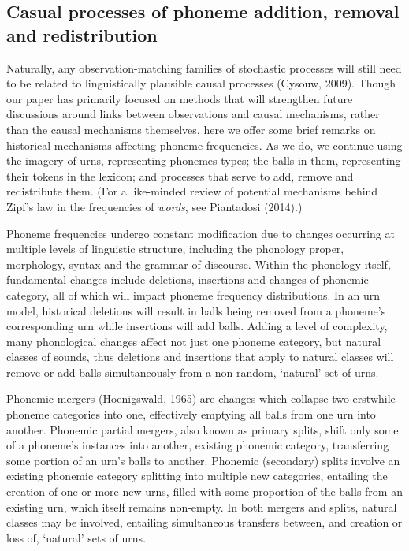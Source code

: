 \hypertarget{casual-processes-of-phoneme-addition-removal-and-redistribution}{%
\subsection*{Casual processes of phoneme addition, removal and redistribution}\label{casual-processes-of-phoneme-addition-removal-and-redistribution}}

Naturally, any observation-matching families of stochastic processes will still need to be related to linguistically plausible causal processes (Cysouw, 2009). Though our paper has primarily focused on methods that will strengthen future discussions around links between observations and causal mechanisms, rather than the causal mechanisms themselves, here we offer some brief remarks on historical mechanisms affecting phoneme frequencies. As we do, we continue using the imagery of urns, representing phonemes types; the balls in them, representing their tokens in the lexicon; and processes that serve to add, remove and redistribute them. (For a like-minded review of potential mechanisms behind Zipf's law in the frequencies of \emph{words}, see Piantadosi (2014).)

Phoneme frequencies undergo constant modification due to changes occurring at multiple levels of linguistic structure, including the phonology proper, morphology, syntax and the grammar of discourse. Within the phonology itself, fundamental changes include deletions, insertions and changes of phonemic category, all of which will impact phoneme frequency distributions. In an urn model, historical deletions will result in balls being removed from a phoneme's corresponding urn while insertions will add balls. Adding a level of complexity, many phonological changes affect not just one phoneme category, but natural classes of sounds, thus deletions and insertions that apply to natural classes will remove or add balls simultaneously from a non-random, `natural' set of urns.

Phonemic mergers (Hoenigswald, 1965) are changes which collapse two erstwhile phoneme categories into one, effectively emptying all balls from one urn into another. Phonemic partial mergers, also known as primary splits, shift only some of a phoneme's instances into another, existing phonemic category, transferring some portion of an urn's balls to another. Phonemic (secondary) splits involve an existing phonemic category splitting into multiple new categories, entailing the creation of one or more new urns, filled with some proportion of the balls from an existing urn, which itself remains non-empty. In both mergers and splits, natural classes may be involved, entailing simultaneous transfers between, and creation or loss of, `natural' sets of urns.

